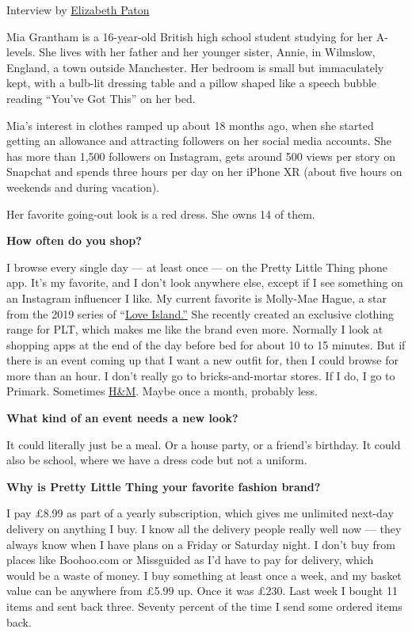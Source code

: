 Interview by
\href{https://www.nytimes3xbfgragh.onion/by/elizabeth-paton}{Elizabeth
Paton}

Mia Grantham is a 16-year-old British high school student studying for
her A-levels. She lives with her father and her younger sister, Annie,
in Wilmslow, England, a town outside Manchester. Her bedroom is small
but immaculately kept, with a bulb-lit dressing table and a pillow
shaped like a speech bubble reading ``You've Got This'' on her bed.

Mia's interest in clothes ramped up about 18 months ago, when she
started getting an allowance and attracting followers on her social
media accounts. She has more than 1,500 followers on Instagram, gets
around 500 views per story on Snapchat and spends three hours per day on
her iPhone XR (about five hours on weekends and during vacation).

Her favorite going-out look is a red dress. She owns 14 of them.

\textbf{How often do you shop?}

I browse every single day --- at least once --- on the Pretty Little
Thing phone app. It's my favorite, and I don't look anywhere else,
except if I see something on an Instagram influencer I like. My current
favorite is Molly-Mae Hague, a star from the 2019 series of
``\href{https://www.nytimes3xbfgragh.onion/2018/07/26/opinion/sunday/love-island-sex-britain.html}{Love
Island.''} She recently created an exclusive clothing range for PLT,
which makes me like the brand even more. Normally I look at shopping
apps at the end of the day before bed for about 10 to 15 minutes. But if
there is an event coming up that I want a new outfit for, then I could
browse for more than an hour. I don't really go to bricks-and-mortar
stores. If I do, I go to Primark. Sometimes
\href{https://www.nytimes3xbfgragh.onion/2018/03/27/business/hm-clothes-stock-sales.html}{H\&M}.
Maybe once a month, probably less.

\textbf{What kind of an event needs a new look?}

It could literally just be a meal. Or a house party, or a friend's
birthday. It could also be school, where we have a dress code but not a
uniform.

\textbf{Why is Pretty Little Thing your favorite fashion brand?}

I pay £8.99 as part of a yearly subscription, which gives me unlimited
next-day delivery on anything I buy. I know all the delivery people
really well now --- they always know when I have plans on a Friday or
Saturday night. I don't buy from places like Boohoo.com or Missguided as
I'd have to pay for delivery, which would be a waste of money. I buy
something at least once a week, and my basket value can be anywhere from
£5.99 up. Once it was £230. Last week I bought 11 items and sent back
three. Seventy percent of the time I send some ordered items back.

